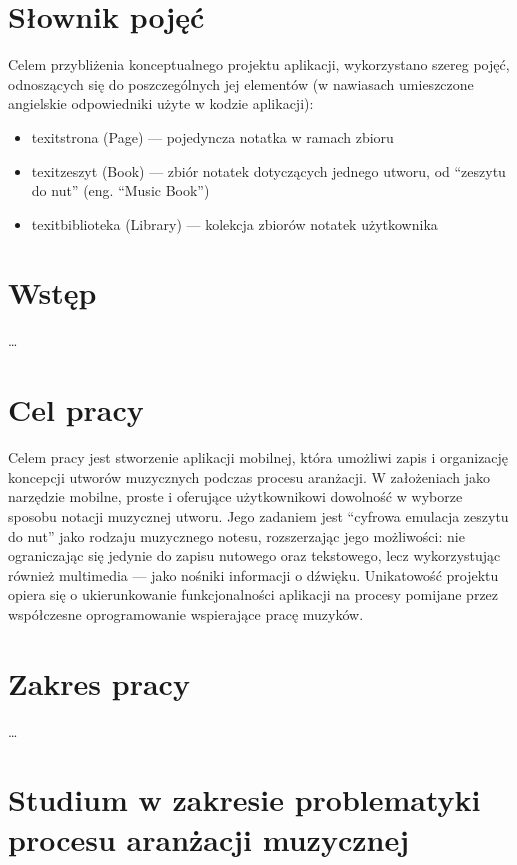 \documentclass[12pt]{article}
\begin{document}
\newpage
\clearpage
\tableofcontents

\newpage
{}
\section*{Słownik pojęć}
Celem przybliżenia konceptualnego projektu aplikacji, wykorzystano szereg pojęć, odnoszących się do poszczególnych jej
elementów (w nawiasach umieszczone angielskie odpowiedniki użyte w kodzie aplikacji):
\begin{itemize}
	\item texit{strona} (Page) — pojedyncza notatka w ramach zbioru
	\item texit{zeszyt} (Book) — zbiór notatek dotyczących jednego utworu, od \enquote{zeszytu do nut} (eng. \enquote{Music Book})
	\item texit{biblioteka} (Library) — kolekcja zbiorów notatek użytkownika
\end{itemize}

\newpage
{}
\section*{Wstęp}
…

\newpage
{}
\section*{Cel pracy}
Celem pracy jest stworzenie aplikacji mobilnej, która umożliwi zapis i organizację koncepcji utworów muzycznych podczas procesu aranżacji.
W założeniach jako narzędzie mobilne, proste i oferujące użytkownikowi dowolność w wyborze sposobu notacji muzycznej utworu.
Jego zadaniem jest \enquote{cyfrowa emulacja zeszytu do nut} jako rodzaju muzycznego notesu, rozszerzając jego możliwości: nie
ograniczając się jedynie do zapisu nutowego oraz tekstowego, lecz wykorzystując również multimedia — jako nośniki informacji o dźwięku.
Unikatowość projektu opiera się o ukierunkowanie funkcjonalności aplikacji na procesy pomijane przez współczesne oprogramowanie
wspierające pracę muzyków.

\newpage
{}
\section*{Zakres pracy}
…

\newpage
\section{Studium w zakresie problematyki procesu aranżacji muzycznej}

\end{document}
